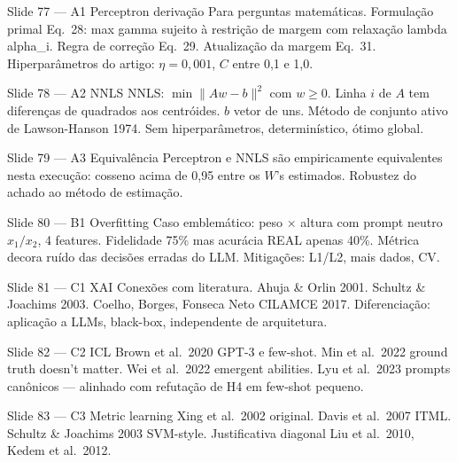 \documentclass[aspectratio=169,10pt]{beamer}
\begin{document}
\begin{frame}{Slide 77 --- A1 Perceptron deriva\c{c}\~ao}
\footnotesize
Para perguntas matem\'aticas. Formula\c{c}\~ao primal Eq.\ 28: max gamma sujeito \`a restri\c{c}\~ao de margem com relaxa\c{c}\~ao lambda alpha\_i. Regra de corre\c{c}\~ao Eq.\ 29. Atualiza\c{c}\~ao da margem Eq.\ 31. Hiperpar\^ametros do artigo: $\eta = 0{,}001$, $C$ entre 0{,}1 e 1{,}0.
\end{frame}

\begin{frame}{Slide 78 --- A2 NNLS}
\footnotesize
NNLS: $\min \|Aw - b\|^2$ com $w \geq 0$. Linha $i$ de $A$ tem diferen\c{c}as de quadrados aos centr\'oides. $b$ vetor de uns. M\'etodo de conjunto ativo de Lawson-Hanson 1974. Sem hiperpar\^ametros, determin\'istico, \'otimo global.
\end{frame}

\begin{frame}{Slide 79 --- A3 Equival\^encia}
\footnotesize
Perceptron e NNLS s\~ao empiricamente equivalentes nesta execu\c{c}\~ao: cosseno acima de 0{,}95 entre os $W$'s estimados. Robustez do achado ao m\'etodo de estima\c{c}\~ao.
\end{frame}

\begin{frame}{Slide 80 --- B1 Overfitting}
\footnotesize
Caso emblem\'atico: peso $\times$ altura com prompt neutro $x_1/x_2$, 4 features. Fidelidade 75\% mas acur\'acia REAL apenas 40\%. M\'etrica decora ru\'ido das decis\~oes erradas do LLM. Mitiga\c{c}\~oes: L1/L2, mais dados, CV.
\end{frame}

\begin{frame}{Slide 81 --- C1 XAI}
\footnotesize
Conex\~oes com literatura. Ahuja \& Orlin 2001. Schultz \& Joachims 2003. Coelho, Borges, Fonseca Neto CILAMCE 2017. Diferencia\c{c}\~ao: aplica\c{c}\~ao a LLMs, black-box, independente de arquitetura.
\end{frame}

\begin{frame}{Slide 82 --- C2 ICL}
\footnotesize
Brown et al.\ 2020 GPT-3 e few-shot. Min et al.\ 2022 ground truth doesn't matter. Wei et al.\ 2022 emergent abilities. Lyu et al.\ 2023 prompts can\^onicos --- alinhado com refuta\c{c}\~ao de H4 em few-shot pequeno.
\end{frame}

\begin{frame}{Slide 83 --- C3 Metric learning}
\footnotesize
Xing et al.\ 2002 original. Davis et al.\ 2007 ITML. Schultz \& Joachims 2003 SVM-style. Justificativa diagonal Liu et al.\ 2010, Kedem et al.\ 2012.
\end{frame}
\end{document}
